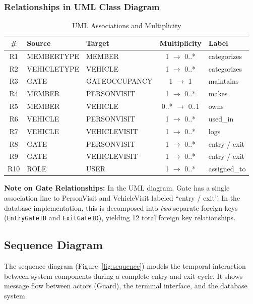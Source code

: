 \documentclass[a4paper, 12pt]{article}
\begin{document}
\subsubsection{Relationships in UML Class Diagram}

\begin{table}[H]
\centering
\caption{UML Associations and Multiplicity}
\label{tab:uml-relationships}
\small
\begin{tabularx}{\textwidth}{c l l c l}
\toprule
\textbf{\#} & \textbf{Source} & \textbf{Target} & \textbf{Multiplicity} & \textbf{Label} \\
\midrule
R1 & MEMBERTYPE & MEMBER & 1 $\rightarrow$ 0..* & categorizes \\
R2 & VEHICLETYPE & VEHICLE & 1 $\rightarrow$ 0..* & categorizes \\
R3 & GATE & GATEOCCUPANCY & 1 $\rightarrow$ 1 & maintains \\
R4 & MEMBER & PERSONVISIT & 1 $\rightarrow$ 0..* & makes \\
R5 & MEMBER & VEHICLE & 0..* $\rightarrow$ 0..1 & owns \\
R6 & VEHICLE & PERSONVISIT & 1 $\rightarrow$ 0..* & used\_in \\
R7 & VEHICLE & VEHICLEVISIT & 1 $\rightarrow$ 0..* & logs \\
R8 & GATE & PERSONVISIT & 1 $\rightarrow$ 0..* & entry / exit \\
R9 & GATE & VEHICLEVISIT & 1 $\rightarrow$ 0..* & entry / exit \\
R10 & ROLE & USER & 1 $\rightarrow$ 0..* & assigned\_to \\
\bottomrule
\end{tabularx}
\end{table}

\textbf{Note on Gate Relationships:} In the UML diagram, Gate has a single association line to PersonVisit and VehicleVisit labeled ``entry / exit''. In the database implementation, this is decomposed into \textit{two} separate foreign keys (\texttt{EntryGateID} and \texttt{ExitGateID}), yielding 12 total foreign key relationships.

\newpage
\subsection{Sequence Diagram}
\label{subsec:sequence}

The sequence diagram (Figure~\ref{fig:sequence}) models the temporal interaction between system components during a complete entry and exit cycle. It shows message flow between actors (Guard), the terminal interface, and the database system.
\end{document}
